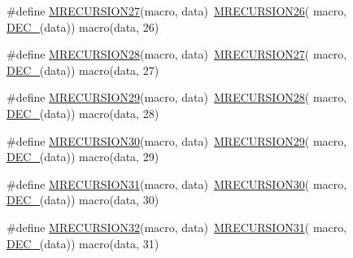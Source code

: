 \begin{DoxyCompactItemize}
\item 
\#define \mbox{\hyperlink{group__group__sam0__utils__mrecursion_gac80453410a8ee5d6e0e0b0c2c3f287e2}{M\+R\+E\+C\+U\+R\+S\+I\+O\+N27}}(macro,  data)~\mbox{\hyperlink{group__group__sam0__utils__mrecursion_ga1489cb59fe5eae201d1b3ef286a3a0bf}{M\+R\+E\+C\+U\+R\+S\+I\+O\+N26}}(  macro, \mbox{\hyperlink{group__group__sam0__utils__mrecursion_ga1d23d683797679dca8c3512a54a5dcae}{D\+E\+C\+\_\+}}(data))   macro(data, 26)
\item 
\#define \mbox{\hyperlink{group__group__sam0__utils__mrecursion_ga57cf3ea94a7639a7e56ea4b2692eaca3}{M\+R\+E\+C\+U\+R\+S\+I\+O\+N28}}(macro,  data)~\mbox{\hyperlink{group__group__sam0__utils__mrecursion_gac80453410a8ee5d6e0e0b0c2c3f287e2}{M\+R\+E\+C\+U\+R\+S\+I\+O\+N27}}(  macro, \mbox{\hyperlink{group__group__sam0__utils__mrecursion_ga1d23d683797679dca8c3512a54a5dcae}{D\+E\+C\+\_\+}}(data))   macro(data, 27)
\item 
\#define \mbox{\hyperlink{group__group__sam0__utils__mrecursion_ga08a713aa50ee68cfce7a4c6ace95b062}{M\+R\+E\+C\+U\+R\+S\+I\+O\+N29}}(macro,  data)~\mbox{\hyperlink{group__group__sam0__utils__mrecursion_ga57cf3ea94a7639a7e56ea4b2692eaca3}{M\+R\+E\+C\+U\+R\+S\+I\+O\+N28}}(  macro, \mbox{\hyperlink{group__group__sam0__utils__mrecursion_ga1d23d683797679dca8c3512a54a5dcae}{D\+E\+C\+\_\+}}(data))   macro(data, 28)
\item 
\#define \mbox{\hyperlink{group__group__sam0__utils__mrecursion_ga2de673fe7e4b0c99a0e48aa8f0885d30}{M\+R\+E\+C\+U\+R\+S\+I\+O\+N30}}(macro,  data)~\mbox{\hyperlink{group__group__sam0__utils__mrecursion_ga08a713aa50ee68cfce7a4c6ace95b062}{M\+R\+E\+C\+U\+R\+S\+I\+O\+N29}}(  macro, \mbox{\hyperlink{group__group__sam0__utils__mrecursion_ga1d23d683797679dca8c3512a54a5dcae}{D\+E\+C\+\_\+}}(data))   macro(data, 29)
\item 
\#define \mbox{\hyperlink{group__group__sam0__utils__mrecursion_ga75814302d0a93ce9b7ee446c5e734d71}{M\+R\+E\+C\+U\+R\+S\+I\+O\+N31}}(macro,  data)~\mbox{\hyperlink{group__group__sam0__utils__mrecursion_ga2de673fe7e4b0c99a0e48aa8f0885d30}{M\+R\+E\+C\+U\+R\+S\+I\+O\+N30}}(  macro, \mbox{\hyperlink{group__group__sam0__utils__mrecursion_ga1d23d683797679dca8c3512a54a5dcae}{D\+E\+C\+\_\+}}(data))   macro(data, 30)
\item 
\#define \mbox{\hyperlink{group__group__sam0__utils__mrecursion_gac43f3446adca956aebe694bac78623eb}{M\+R\+E\+C\+U\+R\+S\+I\+O\+N32}}(macro,  data)~\mbox{\hyperlink{group__group__sam0__utils__mrecursion_ga75814302d0a93ce9b7ee446c5e734d71}{M\+R\+E\+C\+U\+R\+S\+I\+O\+N31}}(  macro, \mbox{\hyperlink{group__group__sam0__utils__mrecursion_ga1d23d683797679dca8c3512a54a5dcae}{D\+E\+C\+\_\+}}(data))   macro(data, 31)

\end{DoxyCompactItemize}

